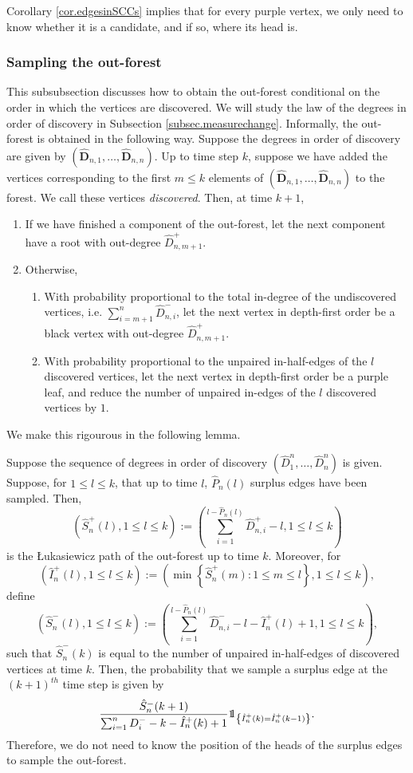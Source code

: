 Corollary \ref{cor.edgesinSCCs} implies that for every purple vertex, we only need to know whether it is a candidate, and if so, where its head is. 
\subsubsection{Sampling the out-forest}\label{subsubsec.samplingoutforest}
This subsubsection discusses how to obtain the out-forest conditional on the order in which the vertices are discovered. We will study the law of the degrees in order of discovery in Subsection \ref{subsec.measurechange}. Informally, the out-forest is obtained in the following way. Suppose the degrees in order of discovery are given by $(\mathbf{\hat{D}}_{n,1},\dots,\mathbf{\hat{D}}_{n,n})$. Up to time step $k$, suppose we have added the vertices corresponding to the first $m\leq k$ elements of  $(\mathbf{\hat{D}}_{n,1},\dots,\mathbf{\hat{D}}_{n,n})$ to the forest. We call these vertices \emph{discovered}. Then, at time $k+1$,
\begin{enumerate}
    \item If we have finished a component of the out-forest, let the next component have a root with out-degree $\hat{D}_{n,m+1}^+$. 
    \item Otherwise,
    \begin{enumerate}\item With probability proportional to the total in-degree of the undiscovered vertices, i.e. $\sum_{i={m+1}}^n \hat{D}_{n,i}^-$, let the next vertex in depth-first order be a black vertex with out-degree $\hat{D}_{n,m+1}^+$.
    \item With probability proportional to the unpaired in-half-edges of the $l$ discovered vertices, let the next vertex in depth-first order be a purple leaf, and reduce the number of unpaired in-edges of the $l$ discovered vertices by $1$.
\end{enumerate}
\end{enumerate}
We make this rigourous in the following lemma.
\begin{lemma}\label{lemma.sampleoutforest}
Suppose the sequence of degrees in order of discovery $(\hat{D}^n_1,\dots,\hat{D}^n_n)$ is given. Suppose, for $1\leq l\leq k$, that up to time $l$, $\hat{P}_n(l)$ surplus edges have been sampled. Then, $$\left(\hat{S}^+_n(l),1\leq l\leq k \right):=\left(\sum_{i=1}^{l-\hat{P}_n(l)}\hat{D}^+_{n,i}-l,1\leq l\leq k\right)$$ is the \L ukasiewicz path of the out-forest up to time $k$. Moreover, for $$\left(\hat{I}^+_n(l),1\leq l\leq k\right):=\left(\min\left\{\hat{S}^+_n(m):1\leq m \leq l\right\},1\leq l \leq k \right),$$
define 
$$\left(\hat{S}^-_n(l),1\leq l \leq k\right):=\left(\sum_{i=1}^{l-\hat{P}_n(l)}\hat{D}^-_{n,i}-l-\hat{I}^+_n(l)+1,1\leq l\leq k\right),$$
such that $\hat{S}^-_n(k)$ is equal to the number of unpaired in-half-edges of discovered vertices at time $k$. Then, the probability that we sample a surplus edge at the $(k+1)^{th}$ time step is given by
$$\frac{\hat{S}^-_n(k+1)}{\sum_{i=1}^n D^-_i-k-\hat{I}^+_n(k)+1}\one_{\left\{\hat{I}^+_n(k)=\hat{I}^+_n(k-1)\right\}}.$$
Therefore, we do not need to know the position of the heads of the surplus edges to sample the out-forest.
\end{lemma}
